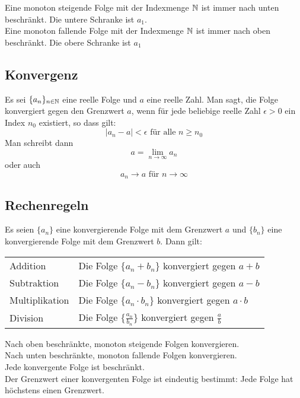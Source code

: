 Eine monoton steigende Folge mit der Indexmenge $\mathbb{N}$ ist immer nach unten beschränkt.
Die untere Schranke ist $a_1$.\\
Eine monoton fallende Folge mit der Indexmenge $\mathbb{N}$ ist immer nach oben beschränkt.
Die obere Schranke ist $a_1$

\subsection{Konvergenz}
Es sei $\{a_n\}_{n \in \mathbb{N}}$ eine reelle Folge und $a$ eine reelle Zahl. Man sagt,
die Folge konvergiert gegen den Grenzwert $a$, wenn für jede beliebige reelle Zahl
$\epsilon > 0$ ein Index $n_0$ existiert, so dass gilt:
\begin{equation*}
	|a_n - a| < \epsilon \mbox{ für alle } n \geq n_0
\end{equation*}
Man schreibt dann
\begin{equation*}
	a = \lim_{n \rightarrow \infty} a_n
\end{equation*}
oder auch
\begin{equation*}
	a_n \rightarrow a \mbox{ für } n \rightarrow \infty
\end{equation*}

\subsection{Rechenregeln}
Es seien $\{a_n\}$ eine konvergierende Folge mit dem Grenzwert $a$ und 
$\{b_n\}$ eine konvergierende Folge mit dem Grenzwert $b$. Dann gilt:

\settowidth{\MyLenA}{Multiplikation~~}
\begin{tabular}{@{}p{\the\MyLenA}%
				@{}p{\linewidth - \the\MyLenA}}
Addition & Die Folge $\{a_n + b_n\}$ konvergiert gegen $a + b$ \\
Subtraktion & Die Folge $\{a_n - b_n\}$ konvergiert gegen $a - b$ \\
Multiplikation & Die Folge $\{a_n \cdot b_n\}$ konvergiert gegen $a \cdot b$ \\
Division & Die Folge $\{\frac{a_n}{b_n}\}$ konvergiert gegen $\frac{a}{b}$ \\
\end{tabular}

Nach oben beschränkte, monoton steigende Folgen konvergieren.\\
Nach unten beschränkte, monoton fallende Folgen konvergieren.\\
Jede konvergente Folge ist beschränkt.\\
Der Grenzwert einer konvergenten Folge ist eindeutig bestimmt:
Jede Folge hat höchstens einen Grenzwert.